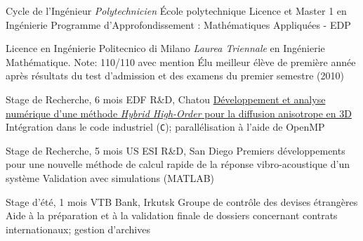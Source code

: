 \documentclass[french]{RMcv}
\begin{document}

%
%
        {Cycle de l'Ing\'enieur \textit{Polytechnicien}}%
        {\'Ecole polytechnique}%
        {Licence et Master 1 en Ing\'enierie}%
        {Programme d'Approfondissement : Math\'ematiques Appliqu\'ees - EDP}


%
%
        {Licence en Ing\'enierie}%
        {Politecnico di Milano}%
        {\emph{Laurea Triennale} en Ing\'enierie Math\'ematique. Note: 110/110 avec mention}%
        {\'Elu meilleur \'el\`eve de premi\`ere ann\'ee apr\`es r\'esultats du test d'admission et des examens du premier semestre (2010)}


%
%
        {Stage de Recherche, 6 mois}%
        {EDF R\&D, Chatou}%
        {\href{https://www.politesi.polimi.it/handle/10589/133692}{D\'eveloppement et analyse num\'erique d'une m\'ethode \emph{Hybrid High-Order} pour la diffusion anisotrope en 3D}}%
        {Int\'egration dans le code industriel \cs{} (\texttt{C}); parall\'elisation \`a l'aide de OpenMP}


%
%
        {Stage de Recherche, 5 mois}%
        {US ESI R\&D, San Diego}%
        {Premiers d\'eveloppements pour une nouvelle m\'ethode de calcul rapide de la r\'eponse vibro-acoustique d'un syst\`eme}%
        {Validation avec simulations (MATLAB)}


%
%
        {Stage d'\'et\'e, 1 mois}%
        {VTB Bank, Irkutsk}%
        {Groupe de contr\^ole des devises \'etrang\`eres}%
        {Aide \`a la pr\'eparation et \`a la validation finale de dossiers concernant contrats internationaux; gestion d'archives}
\end{document}
